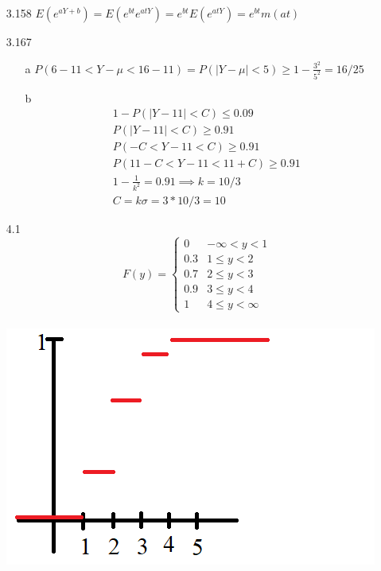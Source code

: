 \documentclass[11pt]{article}
\begin{document}
\begin{enumerate}
        \item[3.158] $E(e^{aY+b}) = E(e^{bt} e^{atY}) = e^{bt} E(e^{atY}) = e^{bt} m(at)$

        \item[3.167]
        \begin{enumerate}
            \item[a] $P(6 - 11 < Y - \mu < 16 - 11) = P(|Y - \mu| < 5) \geq 1 - \frac{3^2}{5^2} = 16/25$
            \item[b]
            \begin{align*}
                1 - P(|Y - 11| < C) \leq 0.09 \\
                P(|Y - 11| < C) \geq 0.91 \\
                P(-C < Y - 11 < C) \geq 0.91 \\
                P(11 - C < Y - 11 < 11 + C) \geq 0.91 \\
                1 - \frac{1}{k^2} = 0.91 \implies k = 10/3 \\
                C = k \sigma = 3*10/3 = 10
            \end{align*}
        \end{enumerate}

        \item[4.1]
         \[
             F(y) = \begin{cases}
                0 & -\infty < y < 1 \\
                0.3 & 1 \leq y < 2 \\
                0.7 & 2 \leq y < 3 \\
                0.9 & 3 \leq y < 4 \\
                1 & 4 \leq y < \infty
            \end{cases}
        \]
        \\
        \includegraphics{4.1b.png}


\end{enumerate}
\end{document}
